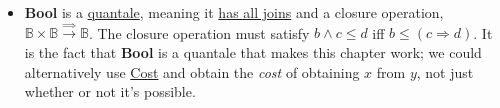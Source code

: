 \begin{itemize}
  \item \textbf{Bool} is a \href{doc/1 math/Seven Sketches in Compositionality/Chapter 2: Resource theories/5 Computing presented V-categories with matrix mult/2 Quantales/1 Quantale}{quantale}, meaning it \href{doc/1 math/Seven Sketches in Compositionality/Chapter 2: Resource theories/5 Computing presented V-categories with matrix mult/2 Quantales/4 Quantale is SMP with all joins}{has all joins} and a closure operation, $\mathbb{B}\times\mathbb{B}\xrightarrow{\Rightarrow}\mathbb{B}$. The closure operation must satisfy $b \land c \leq d$ iff $b \leq (c \Rightarrow d)$. It is the fact that \textbf{Bool} is a quantale that makes this chapter work; we could alternatively use \href{doc/1 math/Seven Sketches in Compositionality/Chapter 2: Resource theories/2 Symmetric monoidal preorders/4 Abstract examples/4 Cost SMP}{Cost} and obtain the \emph{cost} of obtaining $x$ from $y$, not just whether or not it's possible.

  \end{itemize}
